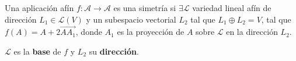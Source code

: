 \begin{ftheorem}[]
\normalfont Una aplicación afín $\displaystyle f : \mathcal{A} \to \mathcal{A} $ es una simetría si $\displaystyle \exists \mathcal{L} $ variedad lineal afín de dirección $\displaystyle L_{1} \in \mathcal{L}\left(V\right) $ y un subespacio vectorial $\displaystyle L_{2}$ tal que $\displaystyle L_{1} \oplus L_{2} = V $, tal que $\displaystyle f\left(A\right) = A + 2\overrightarrow{AA_{1}}  $, donde $\displaystyle A_{1} $ es la proyección de $\displaystyle A $ sobre $\displaystyle \mathcal{L} $ en la dirección $\displaystyle L_{2} $.
\end{ftheorem}
\begin{fdefinition}[]
\normalfont $\displaystyle \mathcal{L} $ es la \textbf{base} de $\displaystyle f $ y $\displaystyle L_{2} $ su \textbf{dirección}.
\end{fdefinition}


